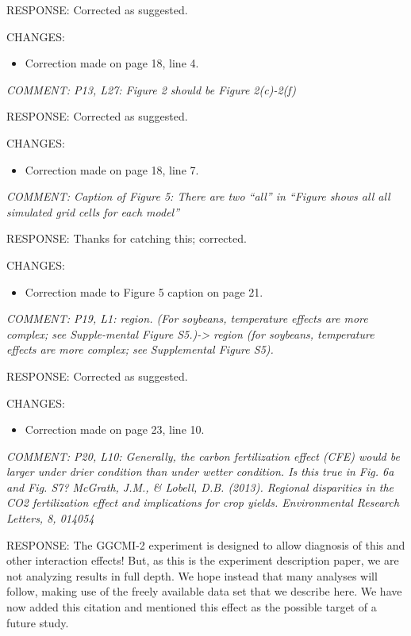 \documentclass[gmd, manuscript]{copernicus} %
\begin{document}
RESPONSE: Corrected as suggested.
\smallskip

CHANGES:
\begin{itemize}
    \item Correction made on page 18, line 4.
\end{itemize}

\smallskip

\textcolor{dark-gray}{\textit{COMMENT: P13, L27: Figure 2 should be Figure 2(c)-2(f)}}

RESPONSE: Corrected as suggested.
\smallskip

CHANGES:
\begin{itemize}
    \item Correction made on page 18, line 7.
\end{itemize}

\smallskip

\textcolor{dark-gray}{\textit{COMMENT: Caption of Figure 5: There are two “all” in “Figure shows all all simulated grid cells for each model”}}

RESPONSE: Thanks for catching this; corrected.
\smallskip

CHANGES:
\begin{itemize}
    \item Correction made to Figure 5 caption on page 21.
\end{itemize}

\smallskip

\textcolor{dark-gray}{\textit{COMMENT: P19, L1: region. (For soybeans, temperature effects are more complex; see Supple-mental Figure S5.)-> region (for soybeans, temperature effects are more complex; see Supplemental Figure S5).}}

RESPONSE: Corrected as suggested.
\smallskip

CHANGES:
\begin{itemize}
    \item Correction made on page 23, line 10.
\end{itemize}

\smallskip

\textcolor{dark-gray}{\textit{COMMENT: P20, L10: Generally, the carbon fertilization effect (CFE) would be larger under drier condition than under wetter condition. Is this true in Fig. 6a and Fig. S7? McGrath, J.M., \& Lobell, D.B. (2013). Regional disparities in the CO2 fertilization effect and implications for crop yields. Environmental Research Letters, 8, 014054}}

RESPONSE: The GGCMI-2 experiment is designed to allow diagnosis of this and other interaction effects! But, as this is the experiment description paper, we are not analyzing results in full depth. We hope instead that many analyses will follow, making use of the freely available data set that we describe here. We have now added this citation and mentioned this effect as the possible target of a future study.
\smallskip
\end{document}
